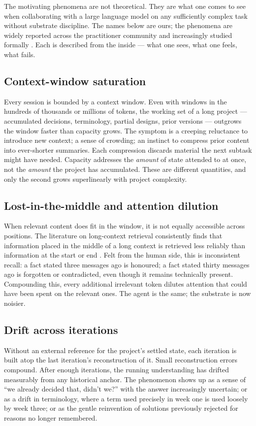 \documentclass[11pt,a4paper,twocolumn]{article}
\begin{document}
The motivating phenomena are not theoretical. They are what one comes
to see when collaborating with a large language model on any
sufficiently complex task without substrate discipline. The names
below are ours; the phenomena are widely reported across the
practitioner community and increasingly studied formally
\citep{liu2024lostmiddle, park2023generativeagents, packer2024memgpt}.
Each is described from the inside --- what one sees, what one feels,
what fails.

\subsection{Context-window saturation}
Every session is bounded by a context window. Even with windows in
the hundreds of thousands or millions of tokens, the working set of
a long project --- accumulated decisions, terminology, partial
designs, prior versions --- outgrows the window faster than capacity
grows. The symptom is a creeping reluctance to introduce new
context; a sense of crowding; an instinct to compress prior content
into ever-shorter summaries. Each compression discards material the
next subtask might have needed. Capacity addresses the
\emph{amount} of state attended to at once, not the \emph{amount}
the project has accumulated. These are different quantities, and
only the second grows superlinearly with project complexity.

\subsection{Lost-in-the-middle and attention dilution}
When relevant content does fit in the window, it is not equally
accessible across positions. The literature on long-context
retrieval consistently finds that information placed in the middle
of a long context is retrieved less reliably than information at the
start or end \citep{liu2024lostmiddle}. Felt from the human side,
this is inconsistent recall: a fact stated three messages ago is
honoured; a fact stated thirty messages ago is forgotten or
contradicted, even though it remains technically present.
Compounding this, every additional irrelevant token dilutes
attention that could have been spent on the relevant ones. The
agent is the same; the substrate is now noisier.

\subsection{Drift across iterations}
Without an external reference for the project's settled state, each
iteration is built atop the last iteration's reconstruction of it.
Small reconstruction errors compound. After enough iterations, the
running understanding has drifted measurably from any historical
anchor. The phenomenon shows up as a sense of ``we already decided
that, didn't we?'' with the answer increasingly uncertain; or as a
drift in terminology, where a term used precisely in week one is
used loosely by week three; or as the gentle reinvention of
solutions previously rejected for reasons no longer remembered.
\end{document}
